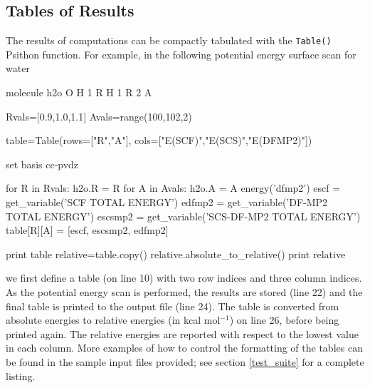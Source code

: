 \subsection{Tables of Results}
The results of computations can be compactly tabulated with the {\tt Table()} Psithon
function. For example, in the following potential energy surface scan for water
\begin{Snippet}
molecule h2o {
  O
  H 1 R
  H 1 R 2 A
}

Rvals=[0.9,1.0,1.1]
Avals=range(100,102,2)

table=Table(rows=["R","A"], cols=["E(SCF)","E(SCS)","E(DFMP2)"])

set basis cc-pvdz

for R in Rvals:
    h2o.R = R
    for A in Avals:
        h2o.A = A
        energy('dfmp2')
        escf = get_variable('SCF TOTAL ENERGY')
        edfmp2 = get_variable('DF-MP2 TOTAL ENERGY')
        escsmp2 = get_variable('SCS-DF-MP2 TOTAL ENERGY')
        table[R][A] = [escf, escsmp2, edfmp2]

print table
relative=table.copy()
relative.absolute_to_relative()
print relative
\end{Snippet}
we first define a table (on line 10) with two row indices and three column
indices. As the potential energy scan is performed, the results are stored
(line 22) and the final table is printed to the output file (line 24). The
table is converted from absolute energies to relative energies (in kcal mol$^{-1}$)
on line 26, before being printed again. The relative energies are reported with
respect to the lowest value in each column. More examples of how to control the
formatting of the tables can be found in the sample input files provided; see
section \ref{test_suite} for a complete listing.
